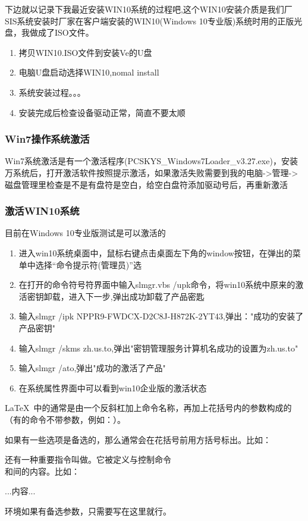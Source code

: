 下边就以记录下我最近安装WIN10系统的过程吧,这个WIN10安装介质是我们厂SIS系统安装时厂家在客户端安装的WIN10(Windows 10专业版)系统时用的正版光盘，我做成了ISO文件。
\begin{enumerate}
	\item 拷贝WIN10.ISO文件到安装Ve的U盘
	\item 电脑U盘启动选择WIN10,nomal install
	\item 系统安装过程。。。
	\item 安装完成后检查设备驱动正常，简直不要太顺
\end{enumerate}
\subsubsection{Win7操作系统激活}
Win7系统激活是有一个激活程序(PCSKYS\_Windows7Loader\_v3.27.exe)，安装万系统后，打开激活软件按照提示激活，如果激活失败需要到我的电脑->管理->磁盘管理里检查是不是有盘符是空白，给空白盘符添加驱动号后，再重新激活
\subsubsection{激活WIN10系统}
目前在Windows 10专业版测试是可以激活的
\begin{enumerate}
	\item 进入win10系统桌面中，鼠标右键点击桌面左下角的window按钮，在弹出的菜单中选择“命令提示符(管理员)”选
	\item 在打开的命令符号符界面中输入slmgr.vbs /upk命令，将win10系统中原来的激活密钥卸载，进入下一步,弹出成功卸载了产品密匙
	\item 输入slmgr /ipk NPPR9-FWDCX-D2C8J-H872K-2YT43,弹出："成功的安装了产品密钥"
	\item 输入slmgr /skms zh.us.to,弹出"密钥管理服务计算机名成功的设置为zh.us.to"
	\item 输入slmgr /ato,弹出"成功的激活了产品"
	\item 在系统属性界面中可以看到win10企业版的激活状态
\end{enumerate}
\LaTeX\ 中的通常是由一个反斜杠加上命令名称，再加上花括号内的参数构成的（有的命令不带参数，例如：）。
如果有一些选项是备选的，那么通常会在花括号前用方括号标出。比如：
还有一种重要指令叫做。它被定义与控制命令\\和间的内容。比如：%
\begin{latex}

...内容...

\end{latex}
环境如果有备选参数，只需要写在这里就行。


